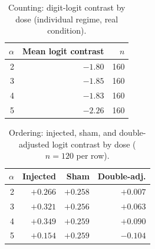 \begin{table}[H]
\centering
\small
\begin{tabular}{rrr}
\toprule
$\alpha$ & Mean logit contrast & $n$ \\
\midrule
2 & $-1.80$ & 160 \\
3 & $-1.85$ & 160 \\
4 & $-1.83$ & 160 \\
5 & $-2.26$ & 160 \\
\bottomrule
\end{tabular}
\caption{Counting: digit-logit contrast by dose (individual regime, real condition).}
\label{tab:app-counting-dose}
\end{table}

\begin{table}[H]
\centering
\small
\begin{tabular}{rrrr}
\toprule
$\alpha$ & Injected & Sham & Double-adj. \\
\midrule
2 & $+0.266$ & $+0.258$ & $+0.007$ \\
3 & $+0.321$ & $+0.256$ & $+0.063$ \\
4 & $+0.349$ & $+0.259$ & $+0.090$ \\
5 & $+0.154$ & $+0.259$ & $-0.104$ \\
\bottomrule
\end{tabular}
\caption{Ordering: injected, sham, and double-adjusted logit contrast by dose ($n=120$ per row).}
\label{tab:app-ordering-dose}
\end{table}

